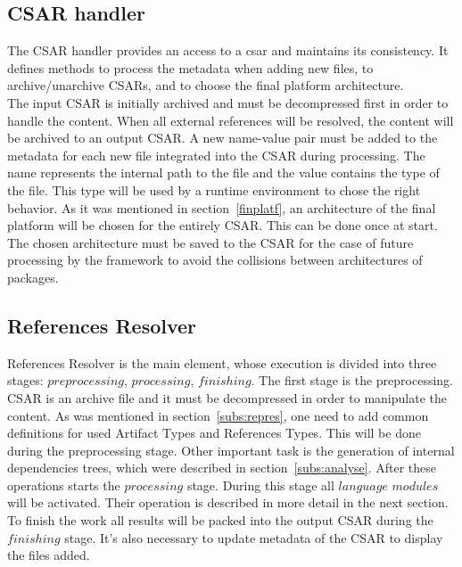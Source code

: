 \subsection{CSAR handler} \label{subs:casr_h}
The CSAR handler provides an access to a \gls{csar} and maintains its consistency. 
It defines methods to process the metadata when adding new files, to \mbox{archive/unarchive} CSARs, and to choose the final platform architecture. \\
The input CSAR is initially archived and must be decompressed first in order to handle the content.
When all external references will be resolved, the content will be archived to an output CSAR.
A new name-value pair must be added to the metadata for each new file integrated into the CSAR during processing. 
The name represents the internal path to the file and the value contains the type of the file. 
This type will be used by a runtime environment to chose the right behavior. %
As it was mentioned in section~\ref{finplatf}, an architecture of the final platform will be chosen for the entirely CSAR.
This can be done once at start.
The chosen architecture must be saved to the CSAR for the case of future processing by the framework to avoid the collisions between architectures of packages.

\subsection{References Resolver} \label{subs:RR}
References Resolver is the main element, whose execution is divided into three stages: $preprocessing$, $processing$, $finishing$. %
The first stage is the preprocessing.
CSAR is an archive file and it must be decompressed in order to manipulate the content. 
As was mentioned in section~\ref{subs:repres}, one need to add common definitions for used Artifact Types and References Types.
This will be done during the preprocessing stage.
Other important task is the generation of internal dependencies trees, which were described in section~\ref{subs:analyse}.
After these operations starts the $processing$ stage.
During this stage all $language$ $modules$ will be activated.
Their operation is described in more detail in the next section. %
To finish the work all results will be packed into the output CSAR during the $finishing$ stage.
It's also necessary to update metadata of the CSAR to display the files added.
%

